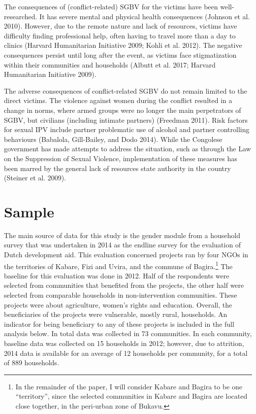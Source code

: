 \documentclass[
]{article}
\begin{document}
The consequences of (conflict-related) SGBV for the victims have been
well-researched. It has severe mental and physical health consequences
(Johnson et al. 2010). However, due to the remote nature and lack of
resources, victims have difficulty finding professional help, often
having to travel more than a day to clinics (Harvard Humanitarian
Initiative 2009; Kohli et al. 2012). The negative consequences persist
until long after the event, as victims face stigmatization within their
communities and households (Albutt et al. 2017; Harvard Humanitarian
Initiative 2009).

The adverse consequences of conflict-related SGBV do not remain limited
to the direct victims. The violence against women during the conflict
resulted in a change in norms, where armed groups were no longer the
main perpetrators of SGBV, but civilians (including intimate partners)
(Freedman 2011). Risk factors for sexual IPV include partner problematic
use of alcohol and partner controlling behaviours (Babalola,
Gill-Bailey, and Dodo 2014). While the Congolese government has made
attempts to address the situation, such as through the Law on the
Suppression of Sexual Violence, implementation of these measures has
been marred by the general lack of resources state authority in the
country (Steiner et al. 2009).

\section*{Sample}\label{sample}

The main source of data for this study is the gender module from a
household survey that was undertaken in 2014 as the endline survey for
the evaluation of Dutch development aid. This evaluation concerned
projects ran by four NGOs in the territories of Kabare, Fizi and Uvira,
and the commune of Bagira.\footnote{In the remainder of the paper, I
  will consider Kabare and Bagira to be one ``territory'', since the
  selected communities in Kabare and Bagira are located close together,
  in the peri-urban zone of Bukavu.} The baseline for this evaluation
was done in 2012. Half of the respondents were selected from communities
that benefited from the projects, the other half were selected from
comparable households in non-intervention communities. These projects
were about agriculture, women's rights and education. Overall, the
beneficiaries of the projects were vulnerable, mostly rural, households.
An indicator for being beneficiary to any of these projects is included
in the full analysis below. In total data was collected in 73
communities. In each community, baseline data was collected on 15
households in 2012; however, due to attrition, 2014 data is available
for an average of 12 households per community, for a total of 889
households.
\end{document}
